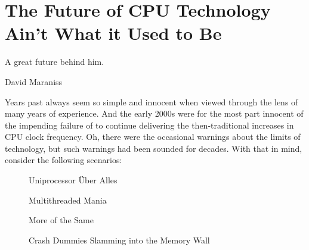 
\section{The Future of CPU Technology Ain't What it Used to Be}
\label{sec:future:The Future of CPU Technology Ain't What it Used to Be}
%
\epigraph{A great future behind him.}{David Maraniss}

Years past always seem so simple and innocent when viewed through the
lens of many years of experience.
And the early 2000s were for the most part innocent of the impending
failure of  to continue delivering the then-traditional
increases in CPU clock frequency.
Oh, there were the occasional warnings about the limits of technology,
but such warnings had been sounded for decades.
With that in mind, consider the following scenarios:

\begin{figure}
\centering
{}
\caption{Uniprocessor \"Uber Alles}
\end{figure}

\begin{figure}
\centering
{}
\caption{Multithreaded Mania}
\end{figure}

\begin{figure}
\centering
{}
\caption{More of the Same}
\end{figure}

\begin{figure}
\centering
{}
\caption{Crash Dummies Slamming into the Memory Wall}
\end{figure}

